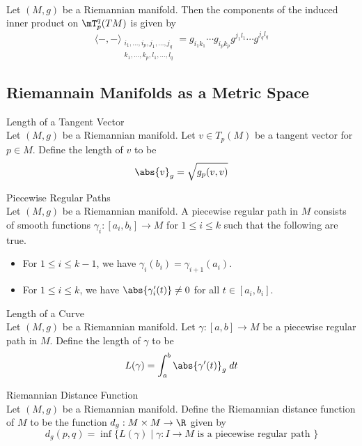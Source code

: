 \documentclass[a4paper]{article}
\begin{document}
\begin{prp}{}{}\\
Let $(M,g)$ be a Riemannian manifold. Then the components of the induced inner product on $\mT_p^q(TM)$ is given by $$\langle-,-\rangle_{\substack{i_1,\dots,i_p,j_1,\dots,j_q\\k_1,\dots,k_p,l_1,\dots,l_q}}=g_{i_1k_1}\cdots g_{i_pk_p}g^{j_1l_1}\cdots g^{j_ql_q}$$
\end{prp}

\subsection{Riemannain Manifolds as a Metric Space}
\begin{defn}{Length of a Tangent Vector}{}\\
Let $(M,g)$ be a Riemannian manifold. Let $v\in T_p(M)$ be a tangent vector for $p\in M$. Define the length of $v$ to be $$\abs{v}_g=\sqrt{g_p(v,v)}$$
\end{defn}

\begin{defn}{Piecewise Regular Paths}{}\\
Let $(M,g)$ be a Riemannian manifold. A piecewise regular path in $M$ consists of smooth functions $\gamma_i:[a_i,b_i]\to M$ for $1\leq i\leq k$ such that the following are true. 
\begin{itemize}
\item For $1\leq i\leq k-1$, we have $\gamma_i(b_i)=\gamma_{i+1}(a_i)$. 
\item For $1\leq i\leq k$, we have $\abs{\gamma_i'(t)}\neq 0$ for all $t\in[a_i,b_i]$. 
\end{itemize}
\end{defn}

\begin{defn}{Length of a Curve}{}\\
Let $(M,g)$ be a Riemannian manifold. Let $\gamma:[a,b]\to M$ be a piecewise regular path in $M$. Define the length of $\gamma$ to be $$L(\gamma)=\int_a^b\abs{\gamma'(t)}_g\;dt$$
\end{defn}

\begin{defn}{Riemannian Distance Function}{}\\
Let $(M,g)$ be a Riemannian manifold. Define the Riemannian distance function of $M$ to be the function $d_g:M\times M\to\R$ given by $$d_g(p,q)=\inf\{L(\gamma)\;|\;\gamma:I\to M\text{ is a piecewise regular path }\}$$
\end{defn}
\end{document}
